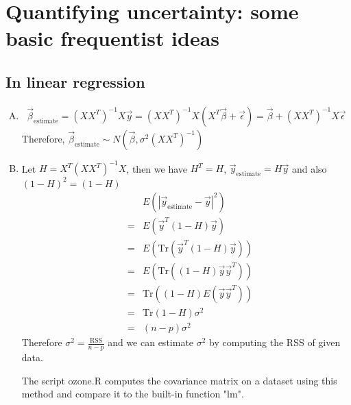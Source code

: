 \documentclass{article}
\begin{document}
\section{Quantifying uncertainty: some basic frequentist ideas}
\subsection{In linear regression}
\begin{enumerate}[(A)]
\item
\begin{eqnarray}
\vec{\beta}_{\textrm{estimate}}=(XX^T)^{-1}X\vec{y}=(XX^T)^{-1}X(X^T\vec{\beta}+\vec{\epsilon})=\vec{\beta}+(XX^T)^{-1}X\vec{\epsilon}
\end{eqnarray}
Therefore, $\vec{\beta}_{\textrm{estimate}}\sim N(\vec{\beta},\sigma^2(XX^T)^{-1})$
\item
Let $H=X^T(XX^T)^{-1}X$, then we have $H^T=H$, $\vec{y}_{\textrm{estimate}}=H\vec{y}$ and also $(1-H)^2=(1-H)$
\begin{eqnarray}
&&E(|\vec{y}_{\textrm{estimate}}-\vec{y}|^2)\nonumber\\
&=&E(\vec{y}^T(1-H)\vec{y})\nonumber\\
&=&E(\textrm{Tr}(\vec{y}^T(1-H)\vec{y}))\nonumber\\
&=&E(\textrm{Tr}((1-H)\vec{y}\vec{y}^T))\nonumber\\
&=&\textrm{Tr}((1-H)E(\vec{y}\vec{y}^T))\nonumber\\
&=&\textrm{Tr}(1-H)\sigma^2\nonumber\\
&=&(n-p)\sigma^2
\end{eqnarray}
Therefore $\sigma^2=\frac{\textrm{RSS}}{n-p}$ and we can estimate $\sigma^2$ by computing the RSS of given data.

The script ozone.R computes the covariance matrix on a dataset using this method and compare it to the built-in function "lm".
\end{enumerate}
\end{document}
